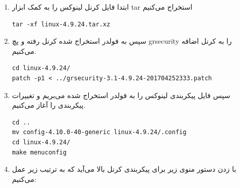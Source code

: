 \documentclass{article}
\begin{document}
\begin{enumerate}

\item ابتدا فایل کرنل لینوکس را به کمک ابزار tar استخراج می‌کنیم

\begin{latin}
\begin{verbatim}
tar -xf linux-4.9.24.tar.xz
\end{verbatim}
\end{latin}

\item سپس به فولدر استخراج شده کرنل رفته و پچ grsecurity را به کرنل اضافه می‌کنیم.

\begin{latin}
\begin{verbatim}
cd linux-4.9.24/
patch -p1 < ../grsecurity-3.1-4.9.24-201704252333.patch
\end{verbatim}
\end{latin}

\item سپس فایل پیکربندی لینوکس را به فولدر استخراج شده می‌بریم و تغییرات پیکربندی را آغاز می‌کنیم.

\begin{latin}
\begin{verbatim}
cd ..
mv config-4.10.0-40-generic linux-4.9.24/.config
cd linux-4.9.24/
make menuconfig
\end{verbatim}
\end{latin}

\item با زدن دستور  منوی زیر برای پیکربندی کرنل بالا می‌آيد که به ترتیب زیر عمل می‌کنیم:

\newpage


\end{enumerate}
\end{document}
